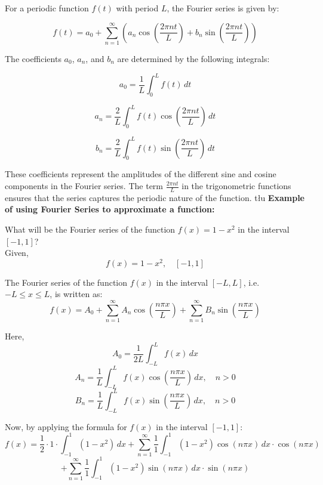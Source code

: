 \documentclass{MathematicaReport}
\begin{document}
For a periodic function \(f(t)\) with period \(L\), the Fourier series is given by:

\begin{equation*}
f(t) = a_0 + \sum_{n=1}^{\infty} \left( a_n \cos\left(\frac{2\pi nt}{L}\right) + b_n \sin\left(\frac{2\pi nt}{L}\right) \right)
\end{equation*}

The coefficients \(a_0\), \(a_n\), and \(b_n\) are determined by the following integrals:

\begin{equation*}
a_0 = \frac{1}{L} \int_{0}^{L} f(t) \, dt
\end{equation*}

\begin{equation*}
a_n = \frac{2}{L} \int_{0}^{L} f(t) \cos\left(\frac{2\pi nt}{L}\right) \, dt
\end{equation*}

\begin{equation*}
b_n = \frac{2}{L} \int_{0}^{L} f(t) \sin\left(\frac{2\pi nt}{L}\right) \, dt
\end{equation*}

These coefficients represent the amplitudes of the different sine and cosine components in the Fourier series. The term \(\frac{2\pi nt}{L}\) in the trigonometric functions ensures that the series captures the periodic nature of the function.
tłu
\textbf{Example of using Fourier Series to approximate a function:}

What will be the Fourier series of the function $f(x)=1-x^2$ in the interval $[-1,1]$? \\

Given,
\[ f(x) = 1 - x^2, \quad [-1, 1] \]

The Fourier series of the function \( f(x) \) in the interval \([-L, L]\), i.e. \(-L \leq x \leq L\), is written as:
\[ f(x) = A_0 + \sum_{n=1}^{\infty} A_n \cos\left(\frac{n\pi x}{L}\right) + \sum_{n=1}^{\infty} B_n \sin\left(\frac{n\pi x}{L}\right) \]

Here,
\[ A_0 = \frac{1}{2L} \int_{-L}^{L} f(x) \,dx \]
\[ A_n = \frac{1}{L} \int_{-L}^{L} f(x) \cos\left(\frac{n\pi x}{L}\right) \,dx, \quad n > 0 \]
\[ B_n = \frac{1}{L} \int_{-L}^{L} f(x) \sin\left(\frac{n\pi x}{L}\right) \,dx, \quad n > 0 \]

Now, by applying the formula for \( f(x) \) in the interval \([-1, 1]\):
\[ f(x) = \frac{1}{2} \cdot 1 \cdot \int_{-1}^{1} (1 - x^2) \,dx + \sum_{n=1}^{\infty} \frac{1}{1} \int_{-1}^{1} (1 - x^2) \cos(n\pi x) \,dx \cdot \cos(n\pi x) \]
\[ + \sum_{n=1}^{\infty} \frac{1}{1} \int_{-1}^{1} (1 - x^2) \sin(n\pi x) \,dx \cdot \sin(n\pi x) \]
\end{document}
